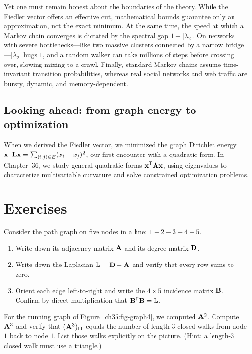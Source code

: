 Yet one must remain honest about the boundaries of the theory. While the Fiedler
vector offers an effective cut, mathematical bounds guarantee only an approximation,
not the exact minimum. At the same time, the speed at which a Markov chain converges is
dictated by the spectral gap $1 - |\lambda_2|$. On networks with severe
bottlenecks---like two massive clusters connected by a narrow bridge---$|\lambda_2|$
hugs $1$, and a random walker can take millions of steps before crossing over, slowing
mixing to a crawl. Finally, standard Markov chains assume time-invariant transition
probabilities, whereas real social networks and web traffic are bursty, dynamic, and
memory-dependent.

\subsection*{Looking ahead: from graph energy to optimization}

When we derived the Fiedler vector, we minimized the graph Dirichlet energy
$\mathbf{x}^{\mathsf{T}}\mathbf{L}\mathbf{x} = \sum_{(i,j)\in E} (x_i - x_j)^2$, our first encounter with a
quadratic form. In Chapter~36, we study general quadratic forms $\mathbf{x}^{\mathsf{T}}\mathbf{A}\mathbf{x}$,
using eigenvalues to characterize multivariable curvature and solve constrained optimization problems.

\section*{Exercises}

\begin{exercise}
\label{ch35:ex-build}
Consider the path graph on five nodes in a line: $1\!-\!2\!-\!3\!-\!4\!-\!5$.
\begin{enumerate}
\item Write down its adjacency matrix $\mathbf{A}$ and its degree matrix $\mathbf{D}$.
\item Write down the Laplacian $\mathbf{L} = \mathbf{D}-\mathbf{A}$ and verify that every row sums to
zero.
\item Orient each edge left-to-right and write the $4\times 5$ incidence matrix $\mathbf{B}$.
Confirm by direct multiplication that $\mathbf{B}^{\mathsf{T}}\mathbf{B} = \mathbf{L}$.
\end{enumerate}
\end{exercise}

\begin{exercise}
\label{ch35:ex-walks}
For the running graph of Figure~\ref{ch35:fig-graph4}, we computed $\mathbf{A}^2$. Compute
$\mathbf{A}^3$ and verify that $(\mathbf{A}^3)_{11}$ equals the number of length-$3$ closed walks
from node $1$ back to node $1$. List those walks explicitly on the picture. (Hint: a
length-$3$ closed walk must use a triangle.)
\end{exercise}

